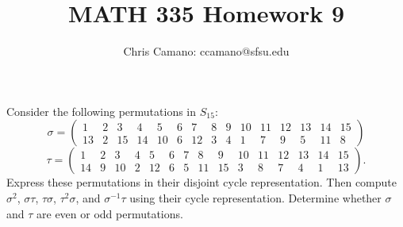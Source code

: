 \documentclass[11pt]{article}
\author{Chris Camano: ccamano@sfsu.edu}
\title{MATH 335  Homework 9 }
\date
\theoremstyle{definition}  %
\newcommand{\block}[2]{\begin{tcolorbox}[title={#1}]{#2}\end{tcolorbox}}
\begin{document}
\maketitle

\block{Question #1}{
Consider the following permutations in $S_{15}$:
  $$ \sigma = \left( \begin{array}{ccccccccccccccc} 1 & 2 & 3 & 4 & 5 & 6 & 7 & 8 & 9 & 10 & 11 & 12 & 13 & 14 & 15 \\
                       13& 2 &15&14&10& 6 &12& 3 & 4 &   1 &   7 &   9 &   5 & 11 &   8 \end{array} \right) $$
  $$      \tau = \left( \begin{array}{ccccccccccccccc} 1 & 2 & 3 & 4 & 5 & 6 & 7 & 8 & 9 & 10 & 11 & 12 & 13 & 14 & 15 \\
                          14& 9 &10& 2 &12 & 6 & 5 & 11 & 15 &   3 &   8 &   7 &   4 & 1 &   13 \end{array} \right). $$
Express these permutations in their disjoint cycle representation. Then
compute $\sigma^2$, $\sigma \tau$, $\tau \sigma$, $\tau^2\sigma$, and $\sigma^{-1} \tau$ using their cycle representation. Determine whether
$\sigma$ and $\tau$ are even or odd permutations.
}
\end{document}
